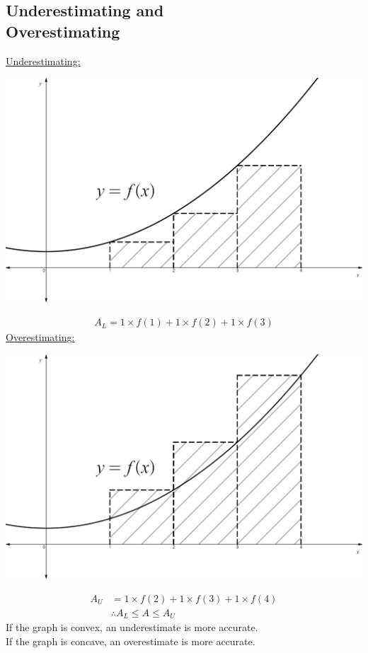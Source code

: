 \documentclass[10pt, a4paper, titlepage]{article}
\begin{document}
\begin{multicols*}{3}
	\subsection{Underestimating and \\Overestimating}
	\underline{Underestimating:}\\
	\begin{center}
		\includegraphics[width=0.9\linewidth]{underestimate.png}\\
	\end{center}
	\begin{align}
		A_L=1\times f(1)+1\times f(2)+1\times f(3)
	\end{align}
	\underline{Overestimating:}\\
	\begin{center}
		\includegraphics[width=0.9\linewidth]{overestimate.png}\\
	\end{center}
	\begin{align}
		A_U&=1\times f(2)+1\times f(3)+1\times f(4)\\
		&\therefore A_L\leq A\leq A_U
	\end{align}
	If the graph is convex, an underestimate is more accurate.\\
	If the graph is concave, an overestimate is more accurate.\\


\end{multicols*}
\end{document}
